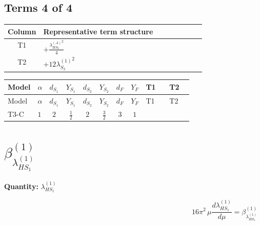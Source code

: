 \documentclass[8pt]{article}
\begin{document}
\begin{landscape}
\subsection*{Terms 4 of 4}
\begin{center}
\begin{tabular}{@{}c >{\raggedright\arraybackslash}p{0.82\linewidth}@{}}
\toprule
Column & Representative term structure \\
\midrule
T1 & \(\displaystyle +\frac{{\lambda_{HS_2}^{(A)}}^2}{4}\) \\
\midrule
T2 & \(\displaystyle +12 {\lambda_{S_2}^{(1)}}^2\) \\
\midrule
\bottomrule
\end{tabular}
\end{center}
\smallskip
\tiny
\begin{longtable}{@{}llcccccc >{\raggedright\arraybackslash}p{0.21\linewidth} >{\raggedright\arraybackslash}p{0.21\linewidth}@{}}
\toprule
Model & $\alpha$ & $d_{S_1}$ & $Y_{S_1}$ & $d_{S_2}$ & $Y_{S_2}$ & $d_F$ & $Y_F$ & T1 & T2 \\
\midrule
\endfirsthead
\toprule
Model & $\alpha$ & $d_{S_1}$ & $Y_{S_1}$ & $d_{S_2}$ & $Y_{S_2}$ & $d_F$ & $Y_F$ & T1 & T2 \\
\midrule
\endhead
T3-C & $1$ & $2$ & $\frac{1}{2}$ & $2$ & $\frac{3}{2}$ & $3$ & $1$ & \scriptsize\adjustbox{max width=\linewidth}{$\begin{gathered} +\frac{{\lambda_{HS_2}^{(A)}}^2}{4}\end{gathered}$} & \scriptsize\adjustbox{max width=\linewidth}{$\begin{gathered} +12 {\lambda_{S_2}^{(1)}}^2\end{gathered}$} \\
\midrule
\bottomrule
\end{longtable}
\clearpage
\section*{$\beta_{\lambda_{HS_1}^{(1)}}^{(1)}$}
\noindent\textbf{Quantity: }$\lambda_{HS_1}^{(1)}$\par\smallskip
\[16\pi^2\,\mu\frac{d \lambda_{HS_1}^{(1)}}{d\mu}=\beta_{\lambda_{HS_1}^{(1)}}^{(1)}\]

\end{landscape}
\end{document}
